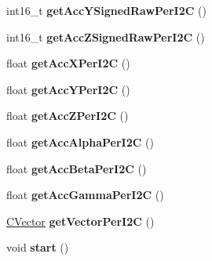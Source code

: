 \begin{DoxyCompactItemize}
\item 
\hypertarget{class_c_b_m_a180_a76d299e0ede75e23c7c27b15391ffc2a}{int16\-\_\-t {\bfseries get\-Acc\-Y\-Signed\-Raw\-Per\-I2\-C} ()}\label{class_c_b_m_a180_a76d299e0ede75e23c7c27b15391ffc2a}

\item 
\hypertarget{class_c_b_m_a180_a70079e27326d0123a0b79ae2c2e1eb65}{int16\-\_\-t {\bfseries get\-Acc\-Z\-Signed\-Raw\-Per\-I2\-C} ()}\label{class_c_b_m_a180_a70079e27326d0123a0b79ae2c2e1eb65}

\item 
\hypertarget{class_c_b_m_a180_ab11c44f987669179c5172b1b77f9b633}{float {\bfseries get\-Acc\-X\-Per\-I2\-C} ()}\label{class_c_b_m_a180_ab11c44f987669179c5172b1b77f9b633}

\item 
\hypertarget{class_c_b_m_a180_ad60528a9b4b1c1ec6cad32b734930476}{float {\bfseries get\-Acc\-Y\-Per\-I2\-C} ()}\label{class_c_b_m_a180_ad60528a9b4b1c1ec6cad32b734930476}

\item 
\hypertarget{class_c_b_m_a180_a6d43bec30f5b932cc5615865af86a66a}{float {\bfseries get\-Acc\-Z\-Per\-I2\-C} ()}\label{class_c_b_m_a180_a6d43bec30f5b932cc5615865af86a66a}

\item 
\hypertarget{class_c_b_m_a180_a03c043a3e8ebb7cc7fac3c5153ba356d}{float {\bfseries get\-Acc\-Alpha\-Per\-I2\-C} ()}\label{class_c_b_m_a180_a03c043a3e8ebb7cc7fac3c5153ba356d}

\item 
\hypertarget{class_c_b_m_a180_afbc6e53796fead89dd732dd18f603d06}{float {\bfseries get\-Acc\-Beta\-Per\-I2\-C} ()}\label{class_c_b_m_a180_afbc6e53796fead89dd732dd18f603d06}

\item 
\hypertarget{class_c_b_m_a180_a8d1de9aea21c4ca82400eb5957e52166}{float {\bfseries get\-Acc\-Gamma\-Per\-I2\-C} ()}\label{class_c_b_m_a180_a8d1de9aea21c4ca82400eb5957e52166}

\item 
\hypertarget{class_c_b_m_a180_ab335f152d838dda55ac631835bc72702}{\hyperlink{class_c_vector}{\-C\-Vector} {\bfseries get\-Vector\-Per\-I2\-C} ()}\label{class_c_b_m_a180_ab335f152d838dda55ac631835bc72702}

\item 
\hypertarget{class_c_b_m_a180_ad026d7a4be6c394c5826a667fc2803c8}{void {\bfseries start} ()}\label{class_c_b_m_a180_ad026d7a4be6c394c5826a667fc2803c8}


\end{DoxyCompactItemize}
